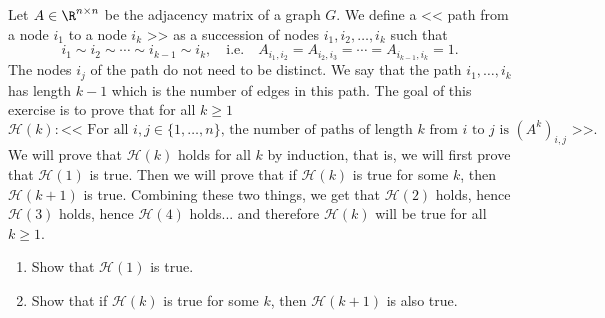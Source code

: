 \documentclass[11pt,nocut]{article}
\begin{document}
\vspace{1mm}

\begin{problem}[2 points]
	Let $A \in \R^{n\times n}$ be the adjacency matrix of a graph $G$.
	We define a << path from a node $i_1$ to a node $i_k$ >> as a succession of nodes $i_1,i_2, \dots, i_{k}$ such that 
	$$
	i_1 \sim i_2 \sim \cdots \sim i_{k-1} \sim i_k,
	\quad \text{i.e.} \quad
	A_{i_1,i_2} = A_{i_2, i_3} = \cdots = A_{i_{k-1},i_k} = 1.
	$$
	The nodes $i_j$ of the path do not need to be distinct. We say that the path $i_1, \dots, i_k$ has length $k-1$ which is the number of edges in this path.
	The goal of this exercise is to prove that for all $k \geq 1$
	$$
	\mathcal{H}(k): \text{<< For all $i,j \in \{1,\dots,n\}$, the number of paths of length $k$ from $i$ to $j$ is $(A^k)_{i,j}$ >>.} 
	$$
	We will prove that $\mathcal{H}(k)$ holds for all $k$ by induction, that is, we will first prove that $\mathcal{H}(1)$ is true. Then we will prove that if $\mathcal{H}(k)$ is true for some $k$, then $\mathcal{H}(k+1)$ is true. Combining these two things, we get that $\mathcal{H}(2)$ holds, hence $\mathcal{H}(3)$ holds, hence $\mathcal{H}(4)$ holds... and therefore $\mathcal{H}(k)$ will be true for all $k \geq 1$.
	
	\begin{enumerate}[label=\normalfont(\textbf{\alph*})]
		\item Show that $\mathcal{H}(1)$ is true.
		\item Show that if $\mathcal{H}(k)$ is true for some $k$, then $\mathcal{H}(k+1)$ is also true.
	\end{enumerate}


\end{problem}

\vspace{1mm}
\end{document}
